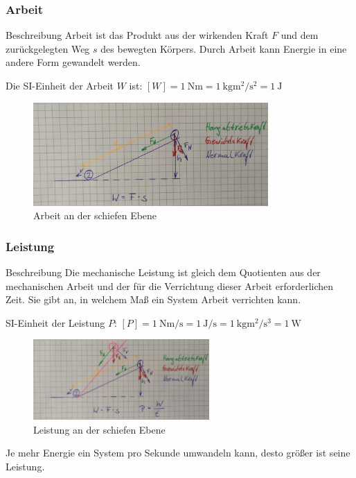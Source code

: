 \documentclass{article}
\begin{document}
\frame
{
  \frametitle{Arbeit}
\begin{block}{Beschreibung}
Arbeit ist das Produkt aus der wirkenden Kraft $F$ und dem zurückgelegten Weg $s$ des bewegten Körpers. Durch Arbeit kann Energie in eine andere Form gewandelt werden.
\end{block}
Die SI-Einheit der Arbeit $W$ ist:
$[W]=\SI{1}{\newton\meter}=\SI{1}{\kilo\gram\square\meter\per\square\second}=\SI{1}{\joule}$
      \begin{figure}
	  \includegraphics[width=0.8\textwidth]{Arbeit_1}
	  \vspace{-3mm}
	  \caption{Arbeit an der schiefen Ebene}
   \end{figure}
}

\frame
{
  \frametitle{Leistung}
\begin{block}{Beschreibung}
Die mechanische Leistung ist gleich dem Quotienten aus der mechanischen Arbeit und der für die Verrichtung dieser Arbeit erforderlichen Zeit. Sie gibt an, in welchem Maß ein System Arbeit verrichten kann.
\end{block}
SI-Einheit der Leistung $P$:
$[P]=\SI{1}{\newton\meter\per\second}=\SI{1}{\joule\per\second}=\SI{1}{\kilo\gram\square\meter\per\cubic\second}=\SI{1}{\watt}$
      \begin{figure}
	  \includegraphics[width=0.6\textwidth]{Leistung}
	  \vspace{-3mm}
	  \caption{Leistung an der schiefen Ebene}
   \end{figure}
   Je mehr Energie ein System pro Sekunde umwandeln kann, desto größer ist seine Leistung.
}
\end{document}
